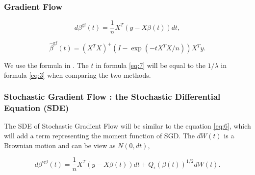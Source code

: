 \documentclass[11pt]{article}
\begin{document}
\subsubsection{Gradient Flow} 

\begin{equation}
\label{eq:6}
    \displaystyle d \beta^{\operatorname{gf}}(t)=\frac{1}{n} X^{T}(y-X \beta(t)) d t ,
\end{equation}

\begin{equation}
\label{eq:7}
    \hat{\beta}^{\operatorname{gf}}(t)=\left(X^{T} X\right)^{+}\left(I-\exp \left(-t X^{T} X / n\right)\right) X^{T} y .
\end{equation}

We use the formula in \cite {ali2020implicit}. The $t$ in formula \ref{eq:7} will be equal to the  $1 / \lambda$ in formula \ref{eq:3} when comparing the two methods.



\subsubsection{Stochastic Gradient Flow : the Stochastic Differential Equation (SDE)}  

The SDE of Stochastic Gradient Flow will be similar to the equation \ref{eq:6}, which will add a term representing the moment function of SGD. The $d W(t)$ is a Brownian motion and can be view as $N(0,d t)$,

\begin{equation}
    \displaystyle d \beta^{\operatorname{sgf}}(t)=\frac{1}{n} X^{T}(y-X \beta(t)) d t+Q_{\epsilon}(\beta(t))^{1 / 2} d W(t) .
\end{equation}
\end{document}
